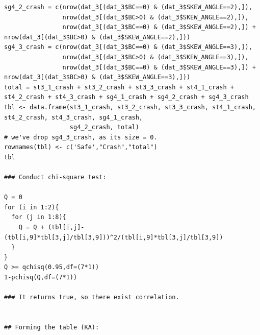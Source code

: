 \documentclass[11pt]{scrartcl} %
\begin{document}
\begin{lstlisting}
sg4_2_crash = c(nrow(dat_3[(dat_3$BC==0) & (dat_3$SKEW_ANGLE==2),]),
                nrow(dat_3[(dat_3$BC>0) & (dat_3$SKEW_ANGLE==2),]),
                nrow(dat_3[(dat_3$BC==0) & (dat_3$SKEW_ANGLE==2),]) + nrow(dat_3[(dat_3$BC>0) & (dat_3$SKEW_ANGLE==2),]))
sg4_3_crash = c(nrow(dat_3[(dat_3$BC==0) & (dat_3$SKEW_ANGLE==3),]),
                nrow(dat_3[(dat_3$BC>0) & (dat_3$SKEW_ANGLE==3),]),
                nrow(dat_3[(dat_3$BC==0) & (dat_3$SKEW_ANGLE==3),]) + nrow(dat_3[(dat_3$BC>0) & (dat_3$SKEW_ANGLE==3),]))
total = st3_1_crash + st3_2_crash + st3_3_crash + st4_1_crash + st4_2_crash + st4_3_crash + sg4_1_crash + sg4_2_crash + sg4_3_crash
tbl <- data.frame(st3_1_crash, st3_2_crash, st3_3_crash, st4_1_crash, st4_2_crash, st4_3_crash, sg4_1_crash,
                  sg4_2_crash, total)
# we've drop sg4_3_crash, as its size = 0.
rownames(tbl) <- c('Safe',"Crash","total")
tbl

### Conduct chi-square test:

Q = 0
for (i in 1:2){
  for (j in 1:8){
    Q = Q + (tbl[i,j]-(tbl[i,9]*tbl[3,j]/tbl[3,9]))^2/(tbl[i,9]*tbl[3,j]/tbl[3,9])
  }
}
Q >= qchisq(0.95,df=(7*1))
1-pchisq(Q,df=(7*1))

### It returns true, so there exist correlation.


## Forming the table (KA):


\end{lstlisting}
\end{document}
